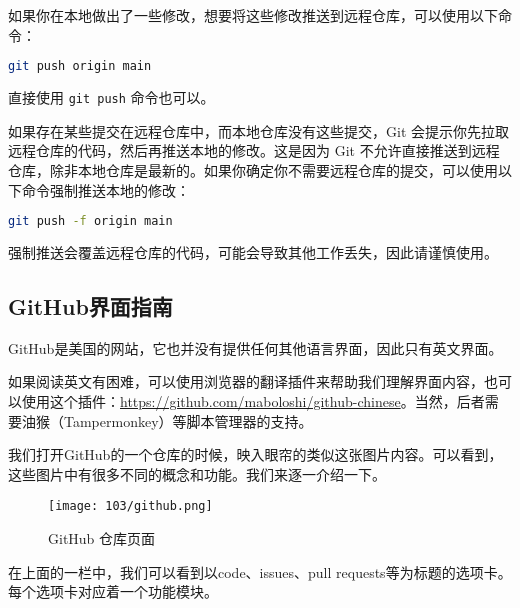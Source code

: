 如果你在本地做出了一些修改，想要将这些修改推送到远程仓库，可以使用以下命令：
\begin{lstlisting}[language=bash]
git push origin main
\end{lstlisting}
直接使用 \texttt{git push} 命令也可以。

如果存在某些提交在远程仓库中，而本地仓库没有这些提交，Git 会提示你先拉取远程仓库的代码，然后再推送本地的修改。这是因为 Git 不允许直接推送到远程仓库，除非本地仓库是最新的。如果你确定你不需要远程仓库的提交，可以使用以下命令强制推送本地的修改：
\begin{lstlisting}[language=bash]
git push -f origin main
\end{lstlisting}

\begin{warning}
  强制推送会覆盖远程仓库的代码，可能会导致其他工作丢失，因此请谨慎使用。
\end{warning}

\subsection{GitHub界面指南}

\begin{tip}
  GitHub是美国的网站，它也并没有提供任何其他语言界面，因此只有英文界面。

  如果阅读英文有困难，可以使用浏览器的翻译插件来帮助我们理解界面内容，也可以使用这个插件：\faGithub\url{https://github.com/maboloshi/github-chinese}。当然，后者需要油猴（Tampermonkey）等脚本管理器的支持。
\end{tip}

我们打开GitHub的一个仓库的时候，映入眼帘的类似这张图片内容。可以看到，这些图片中有很多不同的概念和功能。我们来逐一介绍一下。

\begin{figure}[ht]
  \centering
  \texttt{[image: 103/github.png]}
  \caption{GitHub 仓库页面}
  \label{fig:github}
\end{figure}

在上面的一栏中，我们可以看到以code、issues、pull requests等为标题的选项卡。每个选项卡对应着一个功能模块。

